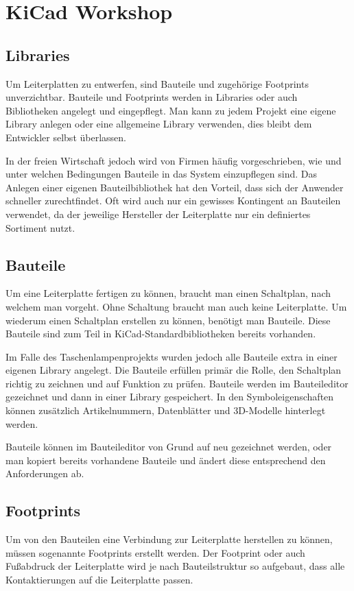 \section{KiCad Workshop}

\subsection{Libraries}
Um Leiterplatten zu entwerfen, sind Bauteile und zugehörige Footprints unverzichtbar.
Bauteile und Footprints werden in Libraries oder auch Bibliotheken angelegt und eingepflegt.
Man kann zu jedem Projekt eine eigene Library anlegen oder eine allgemeine Library verwenden, dies bleibt dem Entwickler selbst überlassen. 

In der freien Wirtschaft jedoch wird von Firmen häufig vorgeschrieben, wie und unter welchen Bedingungen Bauteile in das System einzupflegen sind.
Das Anlegen einer eigenen Bauteilbibliothek hat den Vorteil, dass sich der Anwender schneller zurechtfindet.
Oft wird auch nur ein gewisses Kontingent an Bauteilen verwendet, da der jeweilige Hersteller der Leiterplatte nur ein definiertes Sortiment nutzt. 

\subsection{Bauteile}
Um eine Leiterplatte fertigen zu können, braucht man einen Schaltplan, nach welchem man vorgeht.
Ohne Schaltung braucht man auch keine Leiterplatte.
Um wiederum einen Schaltplan erstellen zu können, benötigt man Bauteile.
Diese Bauteile sind zum Teil in KiCad-Standardbibliotheken bereits vorhanden.

Im Falle des Taschenlampenprojekts wurden jedoch alle Bauteile extra in einer eigenen Library angelegt.
Die Bauteile erfüllen primär die Rolle, den Schaltplan richtig zu zeichnen und auf Funktion zu prüfen.
Bauteile werden im Bauteileditor gezeichnet und dann in einer Library gespeichert.
In den Symboleigenschaften können zusätzlich Artikelnummern, Datenblätter und 3D-Modelle hinterlegt werden.

Bauteile können im Bauteileditor von Grund auf neu gezeichnet werden, oder man kopiert bereits vorhandene Bauteile und ändert diese entsprechend den Anforderungen ab.

\subsection{Footprints}
Um von den Bauteilen eine Verbindung zur Leiterplatte herstellen zu können, müssen sogenannte Footprints erstellt werden.
Der Footprint oder auch Fußabdruck der Leiterplatte wird je nach Bauteilstruktur so aufgebaut, dass alle Kontaktierungen auf die Leiterplatte passen. 

